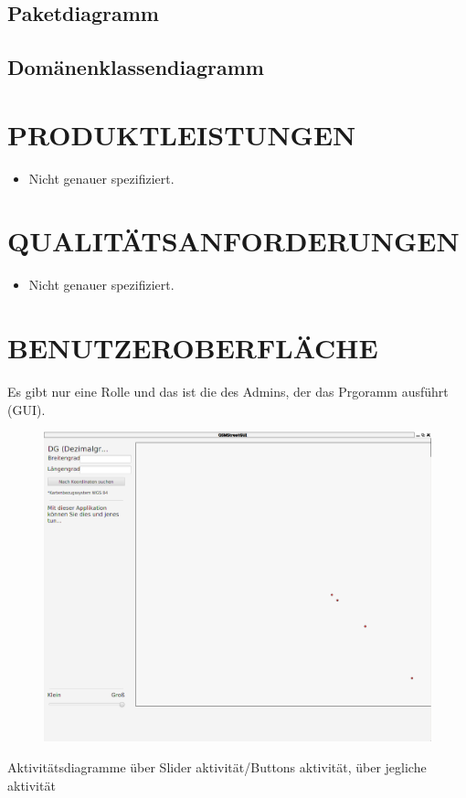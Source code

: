 	\subsection{Paketdiagramm}
	\subsection{Domänenklassendiagramm}
	\section{\Large PRODUKTLEISTUNGEN}
	\begin{itemize}
		\item Nicht genauer spezifiziert.
	\end{itemize} 
		
	
	\section{\Large QUALITÄTSANFORDERUNGEN}
	\begin{itemize}
		\item Nicht genauer spezifiziert.
	\end{itemize}
	
	\section{\Large BENUTZEROBERFLÄCHE}
	Es gibt nur eine Rolle und das ist die des Admins, der das Prgoramm ausführt (GUI).
	\begin{figure}[H]
	\centering
	\includegraphics[width=0.7\linewidth]{images/GUI}
	\caption{}
	\label{fig:GUI}
	\end{figure}
	Aktivitätsdiagramme über Slider aktivität/Buttons aktivität, über jegliche aktivität
	
